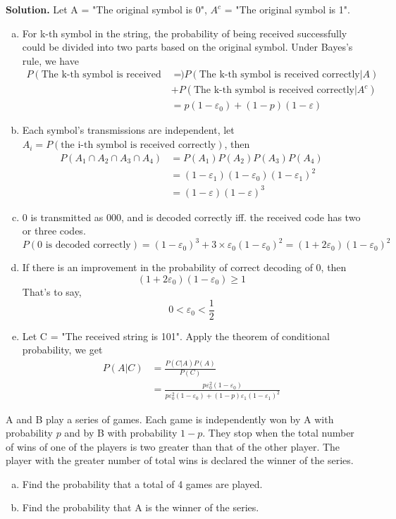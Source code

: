 \documentclass{article}
\begin{document}
{\bf Solution.} 
Let A = "The original symbol is 0", $A^c$ = "The original symbol is 1". 
\begin{enumerate}[(a)]
    \item For k-th symbol in the string, the probability of being received successfully could be divided into two parts based on the original symbol. Under Bayes's rule, we have $$ \begin{align}
    P(\text{The k-th symbol is received correctly})&= P(\text{The k-th symbol is received correctly} | A) \\
    &+ P(\text{The k-th symbol is received correctly} | A^c)\\
    &= p (1-\varepsilon_0) + (1-p) (1-\varepsilon)
    \end{align} $$
    \item Each symbol's transmissions are independent, let $A_i = P(\text{the i-th symbol is received correctly})$, then 
    $$ \begin{align}
    P(A_1 \cap A_2 \cap A_3 \cap A_4) &= P(A_1)P(A_2)P(A_3)P(A_4) \\
    &= (1-\varepsilon_1)(1-\varepsilon_0)(1-\varepsilon_1)^2\\
    &= (1-\varepsilon)(1-\varepsilon)^3
    \end{align} $$
    \item 0 is transmitted as 000, and is decoded correctly iff. the received code has two or three codes. 
    $$ P(\text{0 is decoded correctly}) = (1-\varepsilon_0)^3+3\times \varepsilon_0(1-\varepsilon_0)^2 =(1+2\varepsilon_0)(1-\varepsilon_0)^2$$
    \item If there is an improvement in the probability of correct decoding of 0, then
    $$ (1+2\varepsilon_0)(1-\varepsilon_0) \geq 1$$
    That's to say, 
    $$ 0 < \varepsilon_0 < \frac{1}{2} $$
    \item Let C = "The received string is 101". Apply the theorem of conditional probability, we get
    $$ \begin{align}
        P(A|C) &= \frac{P(C|A)P(A)}{P(C)}\\
        &= \frac{p\varepsilon_0^2(1-\varepsilon_0)}{p\varepsilon_0^2(1-\varepsilon_0)+(1-p)\varepsilon_1(1-\varepsilon_1)^2}
    \end{align} $$
\end{enumerate}

\begin{question}
A and B play a series of games. Each game is independently won by A with probability $p$ and by B with probability $1 - p$. They stop when the total number of wins of one of the players is two greater than that of the other player. The player with the greater number of total wins is declared the winner of the series.

\begin{enumerate}[(a)]
    \item Find the probability that a total of 4 games are played.
    \item Find the probability that A is the winner of the series.
\end{enumerate}
\end{question}
\end{document}
